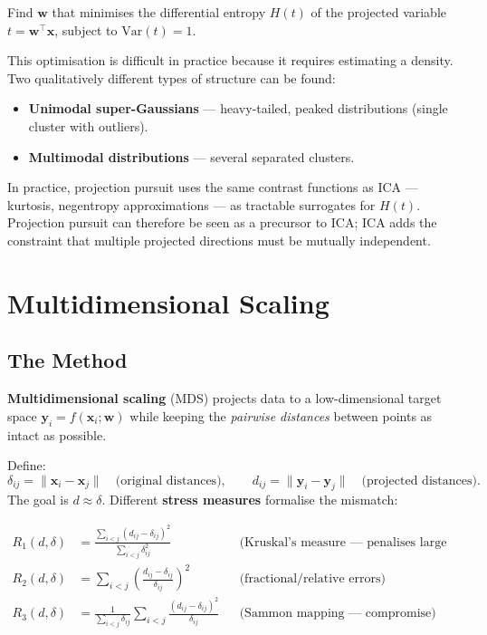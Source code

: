 \documentclass[11pt, oneside]{book}
\newcommand{\T}{^{\top}}
\begin{document}
\begin{defbox}[title={Projection Pursuit Objective}]
Find $\bm{w}$ that minimises the differential entropy $H(t)$ of the projected
variable $t = \bm{w}\T\bm{x}$, subject to $\mathrm{Var}(t)=1$.
\end{defbox}

This optimisation is difficult in practice because it requires estimating a
density.
Two qualitatively different types of structure can be found:
\begin{itemize}
  \item \textbf{Unimodal super-Gaussians} — heavy-tailed, peaked distributions
        (single cluster with outliers).
  \item \textbf{Multimodal distributions} — several separated clusters.
\end{itemize}
In practice, projection pursuit uses the same contrast functions as ICA —
kurtosis, negentropy approximations — as tractable surrogates for $H(t)$.
Projection pursuit can therefore be seen as a precursor to ICA; ICA adds the
constraint that multiple projected directions must be mutually independent.


\section{Multidimensional Scaling}

\subsection{The Method}

\textbf{Multidimensional scaling} (MDS) projects data to a low-dimensional
target space $\bm{y}_i = f(\bm{x}_i;\bm{w})$ while keeping the
\emph{pairwise distances} between points as intact as possible.

Define:
\[
  \delta_{ij} = \|\bm{x}_i - \bm{x}_j\|
  \quad\text{(original distances)},\qquad
  d_{ij} = \|\bm{y}_i - \bm{y}_j\|
  \quad\text{(projected distances)}.
\]
The goal is $d \approx \delta$.
Different \textbf{stress measures} formalise the mismatch:

\begin{align*}
  R_1(d,\delta) &= \frac{\displaystyle\sum_{i<j}(d_{ij}-\delta_{ij})^2}
                        {\displaystyle\sum_{i<j}\delta_{ij}^2}
  && \text{(Kruskal's measure — penalises large absolute errors)} \\[6pt]
  R_2(d,\delta) &= \sum_{i<j}\!\left(\frac{d_{ij}-\delta_{ij}}{\delta_{ij}}\right)^{\!2}
  && \text{(fractional/relative errors)} \\[6pt]
  R_3(d,\delta) &= \frac{1}{\displaystyle\sum_{i<j}\delta_{ij}}
                   \sum_{i<j}\frac{(d_{ij}-\delta_{ij})^2}{\delta_{ij}}
  && \text{(Sammon mapping — compromise)}
\end{align*}
\end{document}
